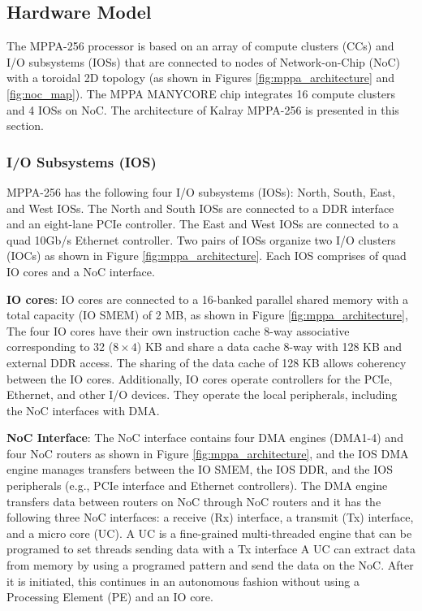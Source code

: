 \documentclass[conference,compsoc]{IEEEtran}
\newcommand{\comment}[1]{}
\begin{document}
\vspace{-4mm}
\subsection{Hardware Model}
\label{sec:hardware_model}
\vspace{-4mm}
The MPPA-256 processor is based on an array of compute clusters (CCs) and I/O subsystems (IOSs) that are connected to nodes of Network-on-Chip (NoC) with a toroidal 2D topology 
(as shown in Figures \ref{fig:mppa_architecture} and \ref{fig:noc_map}).
The MPPA MANYCORE chip integrates 16 compute clusters and 4 IOSs on NoC.
The architecture of Kalray MPPA-256 is presented in this section.

\vspace{-3mm}
\subsubsection{I/O Subsystems (IOS)}
\label{sec:ios}
MPPA-256 has the following four I/O subsystems (IOSs): North, South, East, and West IOSs.
The North and South IOSs are connected to a DDR interface and an eight-lane PCIe controller.
The East and West IOSs are connected to a quad 10Gb/s Ethernet controller.
Two pairs of IOSs organize two I/O clusters (IOCs) as shown in Figure \ref{fig:mppa_architecture}.
Each IOS comprises of quad IO cores and a NoC interface.

\textbf{IO cores}: IO cores are connected to a 16-banked parallel shared memory with a total capacity (IO SMEM) of 2 MB, as shown in Figure \ref{fig:mppa_architecture},
The four IO cores have their own instruction cache 8-way associative corresponding to 32 ($8 \times 4$) KB and share a data cache 8-way with 128 KB and external DDR access.
The sharing of the data cache of 128 KB allows coherency between the IO cores.
Additionally, IO cores operate controllers for the PCIe, Ethernet, \comment{1-11} and other I/O devices.
They operate the local peripherals, including the NoC interfaces with DMA.

\textbf{NoC Interface}: The NoC interface contains four DMA engines (DMA1-4) and four NoC routers as shown in Figure \ref{fig:mppa_architecture}, and the IOS DMA engine manages transfers between the IO SMEM, the IOS DDR, and the IOS peripherals (e.g., PCIe interface and Ethernet controllers).
The DMA engine transfers data between routers on NoC through NoC routers and it has the following three NoC interfaces: a receive (Rx) interface, a transmit (Tx) interface, and a micro core (UC).
A UC is a fine-grained multi-threaded engine that can be programed to set threads sending data with a Tx interface
A UC can extract data from memory by using a programed pattern and send the data on the NoC.
After it is initiated, this continues in an autonomous fashion without using a Processing Element (PE) and an IO core.
\end{document}
